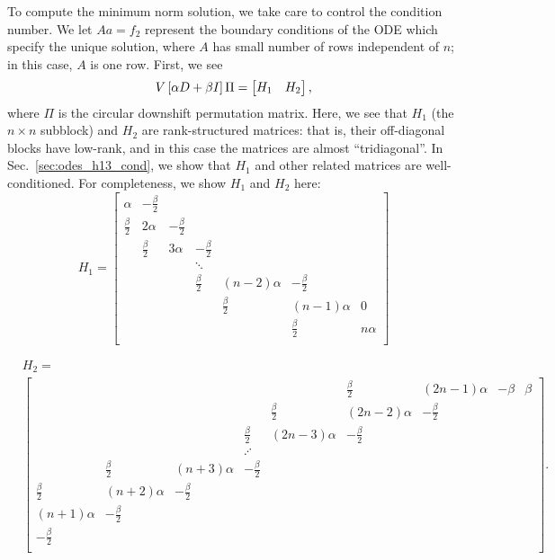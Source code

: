 To compute the minimum norm solution, we take care
to control the condition number.
We let $Aa = f_{2}$ represent the boundary conditions of the ODE
which specify the unique solution,
where $A$ has small number of rows independent of $n$;
in this case, $A$ is one row.
First, we see
%
\begin{equation}
    V\left[ \alpha D + \beta I \right]\Pi
        = \begin{bmatrix} H_{1} & H_{2} \end{bmatrix},
\end{equation}
%
where $\Pi$ is the circular downshift permutation matrix.
Here, we see that $H_{1}$ (the $n\times n$ subblock) and $H_{2}$
are rank-structured matrices:
that is, their off-diagonal blocks have low-rank, and in this case
the matrices are almost ``tridiagonal''.
In Sec.~\ref{sec:odes_h13_cond}, we show
that $H_{1}$ and other related matrices are well-conditioned.
For completeness, we show $H_{1}$ and $H_{2}$ here:
%
\begin{equation}
    H_{1} = \begin{bmatrix}
        \alpha          & -\frac{\beta}{2}         & \\
        \frac{\beta}{2} & 2\alpha & -\frac{\beta}{2} \\
        & \frac{\beta}{2} & 3\alpha & -\frac{\beta}{2} \\
        & & & \ddots & \\
        & & & \frac{\beta}{2} & (n-2)\alpha & -\frac{\beta}{2} \\
        & & & & \frac{\beta}{2} & (n-1)\alpha & 0 \\ 
        & & & & & \frac{\beta}{2} & n\alpha \\
    \end{bmatrix}
    \label{eq:odes_h1_mat}
\end{equation}

\begin{align}
    &H_{2} = \nonumber\\
    &\begin{bmatrix}
        & & & & & \frac{\beta}{2} & (2n-1)\alpha & -\beta & \beta \\
        & & & & \frac{\beta}{2} & (2n-2)\alpha & -\frac{\beta}{2} \\ 
        & & & \frac{\beta}{2} & (2n-3)\alpha & -\frac{\beta}{2} \\
        & & & \iddots & \\
        & \frac{\beta}{2} & (n+3)\alpha & -\frac{\beta}{2} \\
        \frac{\beta}{2} & (n+2)\alpha & -\frac{\beta}{2} \\
        (n+1)\alpha     & -\frac{\beta}{2}         & \\
        -\frac{\beta}{2}&                          & \\
    \end{bmatrix}.
    \label{eq:odes_h2_mat}
\end{align}

